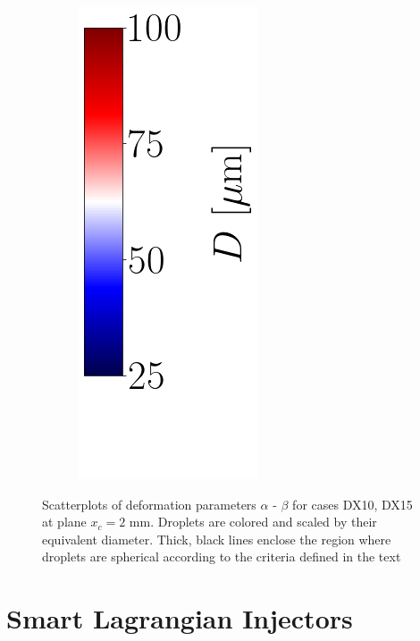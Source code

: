 \begin{figure}[ht]
\begin{subfigure}[b]{0.4\textwidth}
\end{subfigure}
\begin{subfigure}[b]{0.1\textwidth}
	\centering
	\hspace*{0.35in}
   \includegraphics[scale=0.5]{./part3_applications/figures_ch8_resolved/SPRAY_characterization/deformation/scatterplots_colorbar_D_with_blank_space.png}
\end{subfigure}
   \caption[Scatterplots of deformation parameters $\alpha$ - $\beta$ for cases DX10, DX15 at plane $x_c = 2$ mm ]{Scatterplots of deformation parameters $\alpha$ - $\beta$ for cases DX10, DX15 at plane $x_c = 2$ mm. Droplets are colored and scaled by their equivalent diameter. Thick, black lines enclose the region where droplets are spherical according to the criteria defined in the text}
\label{fig:ch8_jicf_global_scatterplots_deformation}
\end{figure}




\section{Smart Lagrangian Injectors}
\label{sec:ch8_learning_SLI_in_BIMER}





